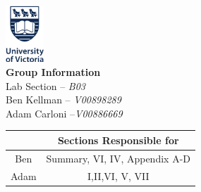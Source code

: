 \documentclass{article}
\begin{document}
\begin{center}
    \vspace{2em}
    \includegraphics[width=1.43cm]{uvic_logo.png}\\
    \vspace{4em}
    \textbf{Group Information}\\
    Lab Section -- \textit{B03}\\
    Ben Kellman -- \textit{V00898289}\\
    Adam Carloni --\textit{V00886669}
\end{center}
\vspace{5em}
\begin{table}[h]
\centering
\begin{tabular}{c|c}
   &   Sections Responsible for\\\hline
 Ben  & Summary, VI, IV, Appendix A-D\\
 Adam & I,II,VI, V, VII
\end{tabular}
\end{table}

\end{document}

